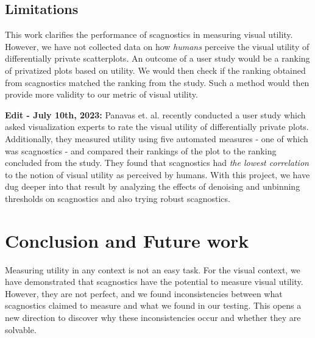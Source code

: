 \documentclass[journal]{vgtc}                     %
\begin{document}
\subsection{Limitations}
This work clarifies the performance of scagnostics in measuring visual utility. However, we have not collected data on how \textit{humans} perceive the visual utility of differentially private scatterplots. An outcome of a user study would be a ranking of privatized plots based on utility. We would then check if the ranking obtained from scagnostics matched the ranking from the study. Such a method would then provide more validity to our metric of visual utility.

\textbf{Edit - July 10th, 2023:} Panavas et. al. \cite{Panavas2023} recently conducted a user study which asked visualization experts to rate the visual utility of differentially private plots. Additionally, they measured utility using five automated measures - one of which was scagnostics - and compared their rankings of the plot to the ranking concluded from the study. They found that scagnostics had\textit{ the lowest correlation} to the notion of visual utility as perceived by humans. With this project, we have dug deeper into that result by analyzing the effects of denoising and unbinning thresholds on scagnostics and also trying robust scagnostics.


\section{Conclusion and Future work}
Measuring utility in any context is not an easy task. For the visual context, we have demonstrated that scagnostics have the potential to measure visual utility. However, they are not perfect, and we found inconsistencies between what scagnostics claimed to measure and what we found in our testing. This opens a new direction to discover why these inconsistencies occur and whether they are solvable.





\end{document}

